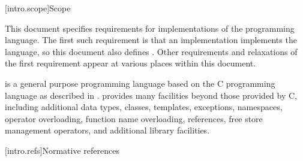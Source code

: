 
[intro.scope]{Scope}

\pnum
{}%
This document specifies requirements for implementations
of the \Cpp{} programming language. The first such requirement is that
an implementation implements the language, so this document also
defines \Cpp{}. Other requirements and relaxations of the first
requirement appear at various places within this document.

\pnum
\Cpp{} is a general purpose programming language based on the C
programming language as described in \IsoC{}.
\Cpp{} provides many facilities
beyond those provided by C, including additional data types,
classes, templates, exceptions, namespaces, operator
overloading, function name overloading, references, free store
management operators, and additional library facilities.%

[intro.refs]{Normative references}%
%


